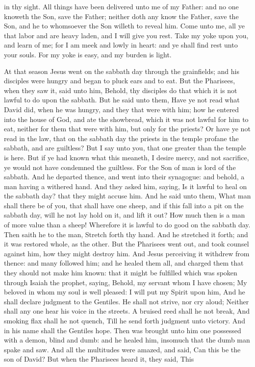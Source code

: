 in thy sight. All things have been delivered unto me of my Father: and no one knoweth the Son, save the Father; neither doth any know the Father, save the Son, and he to whomsoever the Son willeth to reveal him. Come unto me, all ye that labor and are heavy laden, and I will give you rest. Take my yoke upon you, and learn of me; for I am meek and lowly in heart: and ye shall find rest unto your souls. For my yoke is easy, and my burden is light. 

At that season Jesus went on the sabbath day through the grainfields; and his disciples were hungry and began to pluck ears and to eat. But the Pharisees, when they saw it, said unto him, Behold, thy disciples do that which it is not lawful to do upon the sabbath. But he said unto them, Have ye not read what David did, when he was hungry, and they that were with him; how he entered into the house of God, and ate the showbread, which it was not lawful for him to eat, neither for them that were with him, but only for the priests? Or have ye not read in the law, that on the sabbath day the priests in the temple profane the sabbath, and are guiltless? But I say unto you, that one greater than the temple is here. But if ye had known what this meaneth, I desire mercy, and not sacrifice, ye would not have condemned the guiltless. For the Son of man is lord of the sabbath.  And he departed thence, and went into their synagogue: and behold, a man having a withered hand. And they asked him, saying, Is it lawful to heal on the sabbath day? that they might accuse him. And he said unto them, What man shall there be of you, that shall have one sheep, and if this fall into a pit on the sabbath day, will he not lay hold on it, and lift it out? How much then is a man of more value than a sheep! Wherefore it is lawful to do good on the sabbath day. Then saith he to the man, Stretch forth thy hand. And he stretched it forth; and it was restored whole, as the other. But the Pharisees went out, and took counsel against him, how they might destroy him.  And Jesus perceiving it withdrew from thence: and many followed him; and he healed them all, and charged them that they should not make him known: that it might be fulfilled which was spoken through Isaiah the prophet, saying,  Behold, my servant whom I have chosen; My beloved in whom my soul is well pleased: I will put my Spirit upon him, And he shall declare judgment to the Gentiles.  He shall not strive, nor cry aloud; Neither shall any one hear his voice in the streets.  A bruised reed shall he not break, And smoking flax shall he not quench, Till he send forth judgment unto victory.  And in his name shall the Gentiles hope.  Then was brought unto him one possessed with a demon, blind and dumb: and he healed him, insomuch that the dumb man spake and saw. And all the multitudes were amazed, and said, Can this be the son of David? But when the Pharisees heard it, they said, This 